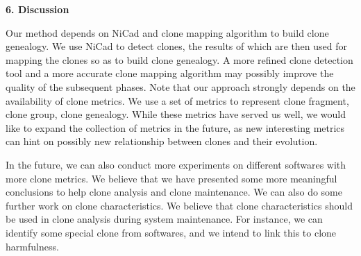 \begin{center}{\large\bf 6. Discussion}\end{center}

Our method depends on NiCad and clone mapping algorithm to build clone genealogy. We use NiCad to detect clones, the results of which are then used for mapping the clones so as to build clone genealogy. A more refined clone detection tool and a more accurate clone mapping algorithm may possibly improve the quality of the subsequent phases. Note that our approach strongly depends on the availability of clone metrics. We use a set of metrics to represent clone fragment, clone group, clone genealogy. While these metrics have served us well, we would like to expand the collection of metrics in the future, as new interesting metrics can hint on possibly new relationship between clones and their evolution. 

In the future, we can also conduct more experiments on different softwares with more clone metrics. We believe that we have presented some more meaningful conclusions to help clone analysis and clone maintenance. We can also do some further work on clone characteristics. We believe that clone characteristics should be used in clone analysis during system maintenance. For instance, we can identify some special clone from softwares, and we intend to link this to clone harmfulness. 

